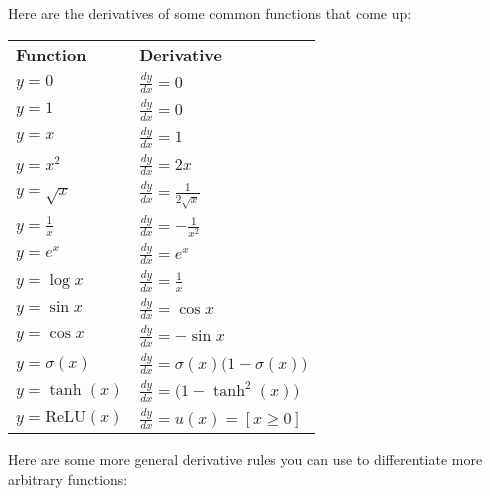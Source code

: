 \documentclass[
  letterpaper,
  DIV=11,
  numbers=noendperiod]{scrreprt}
\begin{document}
Here are the derivatives of some common functions that come up:

\begin{longtable}[]{@{}
  >{\raggedright\arraybackslash}p{}
  >{\raggedright\arraybackslash}p{}@{}}
\toprule()
\endhead
\textbf{Function} & \textbf{Derivative} \\
\(y = 0\) & \(\frac{dy}{dx} = 0\) \\
\(y = 1\) & \(\frac{dy}{dx} = 0\) \\
\(y = x\) & \(\frac{dy}{dx} = 1\) \\
\(y = x^2\) & \(\frac{dy}{dx} = 2x\) \\
\(y = \sqrt{x}\) & \(\frac{dy}{dx} = \frac{1}{2\sqrt{x}}\) \\
\(y = \frac{1}{x}\) & \(\frac{dy}{dx} = -\frac{1}{x^2}\) \\
\(y = e^x\) & \(\frac{dy}{dx} = e^x\) \\
\(y = \log{x}\) & \(\frac{dy}{dx} = \frac{1}{x}\) \\
\(y = \sin{x}\) & \(\frac{dy}{dx} = \cos{x}\) \\
\(y = \cos{x}\) & \(\frac{dy}{dx} = -\sin{x}\) \\
\(y = \sigma(x)\) &
\(\frac{dy}{dx} = \sigma(x)\big(1-\sigma(x)\big)\) \\
\(y = \tanh(x)\) & \(\frac{dy}{dx} = \big(1 - \tanh^2(x)\big)\) \\
\(y = \text{ReLU}(x)\) & \(\frac{dy}{dx} = u(x) = [x \geq 0]\) \\
\bottomrule()
\end{longtable}

Here are some more general derivative rules you can use to differentiate
more arbitrary functions:
\end{document}
